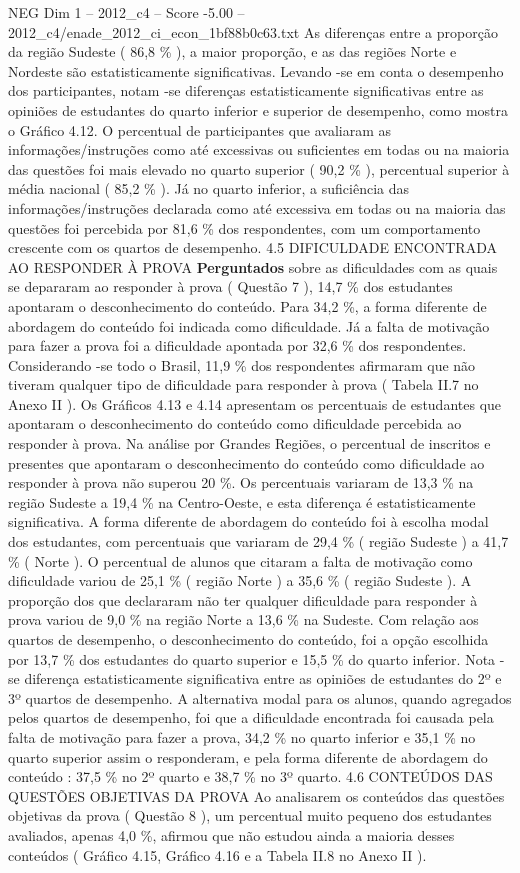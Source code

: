 \begin{textsample}{NEG Dim 1 – 2012\_c4 – Score -5.00 – 2012\_c4/enade\_2012\_ci\_econ\_1bf88b0c63.txt}
As diferenças entre a proporção da região Sudeste ( 86,8 \% ), a maior proporção, e as das regiões Norte e Nordeste são estatisticamente significativas.
Levando -se em conta o desempenho dos participantes, notam -se diferenças estatisticamente significativas entre as opiniões de estudantes do quarto inferior e superior de desempenho, como mostra o Gráfico 4.12.
O percentual de participantes que avaliaram as informações/instruções como até excessivas ou suficientes em todas ou na maioria das questões foi mais elevado no quarto superior ( 90,2 \% ), percentual superior à média nacional ( 85,2 \% ).
Já no quarto inferior, a suficiência das informações/instruções declarada como até excessiva em todas ou na maioria das questões foi percebida por 81,6 \% dos respondentes, com um comportamento crescente com os quartos de desempenho. 4.5 DIFICULDADE ENCONTRADA AO RESPONDER À PROVA \textbf{Perguntados} sobre as dificuldades com as quais se depararam ao responder à prova ( Questão 7 ), 14,7 \% dos estudantes apontaram o desconhecimento do conteúdo.
Para 34,2 \%, a forma diferente de abordagem do conteúdo foi indicada como dificuldade.
Já a falta de motivação para fazer a prova foi a dificuldade apontada por 32,6 \% dos respondentes.
Considerando -se todo o Brasil, 11,9 \% dos respondentes afirmaram que não tiveram qualquer tipo de dificuldade para responder à prova ( Tabela II.7 no Anexo II ).
Os Gráficos 4.13 e 4.14 apresentam os percentuais de estudantes que apontaram o desconhecimento do conteúdo como dificuldade percebida ao responder à prova.
Na análise por Grandes Regiões, o percentual de inscritos e presentes que apontaram o desconhecimento do conteúdo como dificuldade ao responder à prova não superou 20 \%.
Os percentuais variaram de 13,3 \% na região Sudeste a 19,4 \% na Centro-Oeste, e esta diferença é estatisticamente significativa.
A forma diferente de abordagem do conteúdo foi à escolha modal dos estudantes, com percentuais que variaram de 29,4 \% ( região Sudeste ) a 41,7 \% ( Norte ).
O percentual de alunos que citaram a falta de motivação como dificuldade variou de 25,1 \% ( região Norte ) a 35,6 \% ( região Sudeste ).
A proporção dos que declararam não ter qualquer dificuldade para responder à prova variou de 9,0 \% na região Norte a 13,6 \% na Sudeste.
Com relação aos quartos de desempenho, o desconhecimento do conteúdo, foi a opção escolhida por 13,7 \% dos estudantes do quarto superior e 15,5 \% do quarto inferior.
Nota -se diferença estatisticamente significativa entre as opiniões de estudantes do 2º e 3º quartos de desempenho.
A alternativa modal para os alunos, quando agregados pelos quartos de desempenho, foi que a dificuldade encontrada foi causada pela falta de motivação para fazer a prova, 34,2 \% no quarto inferior e 35,1 \% no quarto superior assim o responderam, e pela forma diferente de abordagem do conteúdo : 37,5 \% no 2º quarto e 38,7 \% no 3º quarto. 4.6 CONTEÚDOS DAS QUESTÕES OBJETIVAS DA PROVA Ao analisarem os conteúdos das questões objetivas da prova ( Questão 8 ), um percentual muito pequeno dos estudantes avaliados, apenas 4,0 \%, afirmou que não estudou ainda a maioria desses conteúdos ( Gráfico 4.15, Gráfico 4.16 e a Tabela II.8 no Anexo II ).

\end{textsample}
